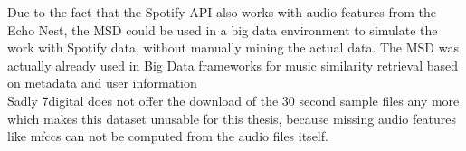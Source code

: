 \FloatBarrier
Due to the fact that the Spotify API\cite{spotifyapi1} also works with audio features from the Echo Nest\cite{echonest1}, the MSD could be used in a big data environment to simulate the work with Spotify data, without manually mining the actual data. The MSD was actually already used in Big Data frameworks for music similarity retrieval based on metadata and user information\cite{msd4}\\
Sadly 7digital does not offer the download of the 30 second sample files any more which makes this dataset unusable for this thesis, because missing audio features like mfccs can not be computed from the audio files itself. 
